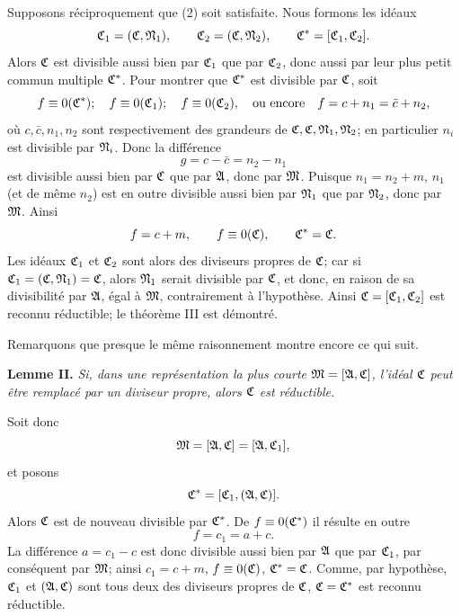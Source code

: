 Supposons réciproquement que (2) soit satisfaite. Nous formons les idéaux
\[
 \mathfrak{C}_1=(\mathfrak{C},\mathfrak{N}_1),\qquad
 \mathfrak{C}_2=(\mathfrak{C},\mathfrak{N}_2),\qquad
 \mathfrak{C}^*=[\mathfrak{C}_1,\mathfrak{C}_2].
\]
Alors $\mathfrak{C}$ est divisible aussi bien par $\mathfrak{C}_1$ que par $\mathfrak{C}_2$, donc aussi par leur plus petit commun multiple $\mathfrak{C}^*$. Pour montrer que $\mathfrak{C}^*$ est divisible par $\mathfrak{C}$, soit
\[
 f\equiv0(\mathfrak{C}^*);\quad f\equiv0(\mathfrak{C}_1);\quad f\equiv0(\mathfrak{C}_2),
 \quad\text{ou encore}\quad f=c+n_1=\bar c+n_2,
\]
où $c,\bar c,n_1,n_2$ sont respectivement des grandeurs de $\mathfrak{C},\mathfrak{C},\mathfrak{N}_1,\mathfrak{N}_2$; en particulier $n_i$ est divisible par $\mathfrak{N}_i$. Donc la différence
\[
 g=c-\bar c=n_2-n_1
\]
est divisible aussi bien par $\mathfrak{C}$ que par $\mathfrak{A}$, donc par $\mathfrak{M}$. Puisque $n_1=n_2+m$, $n_1$ (et de même $n_2$) est en outre divisible aussi bien par $\mathfrak{N}_1$ que par $\mathfrak{N}_2$, donc par $\mathfrak{M}$. Ainsi
\[
 f=c+m,\qquad f\equiv0(\mathfrak{C}),\qquad \mathfrak{C}^*=\mathfrak{C}.
\]
Les idéaux $\mathfrak{C}_1$ et $\mathfrak{C}_2$ sont alors des diviseurs propres de $\mathfrak{C}$; car si $\mathfrak{C}_1=(\mathfrak{C},\mathfrak{N}_1)=\mathfrak{C}$, alors $\mathfrak{N}_1$ serait divisible par $\mathfrak{C}$, et donc, en raison de sa divisibilité par $\mathfrak{A}$, égal à $\mathfrak{M}$, contrairement à l'hypothèse. Ainsi $\mathfrak{C}=[\mathfrak{C}_1,\mathfrak{C}_2]$ est reconnu réductible; le théorème III est démontré.

Remarquons que presque le même raisonnement montre encore ce qui suit.

\textbf{Lemme II.} \emph{Si, dans une représentation la plus courte $\mathfrak{M}=[\mathfrak{A},\mathfrak{C}]$, l'idéal $\mathfrak{C}$ peut être remplacé par un diviseur propre, alors $\mathfrak{C}$ est réductible.}

Soit donc
\[
 \mathfrak{M}=[\mathfrak{A},\mathfrak{C}]=[\mathfrak{A},\mathfrak{C}_1],
\]
et posons
\[
 \mathfrak{C}^*=[\mathfrak{C}_1,(\mathfrak{A},\mathfrak{C})].
\]
Alors $\mathfrak{C}$ est de nouveau divisible par $\mathfrak{C}^*$. De $f\equiv0(\mathfrak{C}^*)$ il résulte en outre
\[
 f=c_1=a+c.
\]
La différence $a=c_1-c$ est donc divisible aussi bien par $\mathfrak{A}$ que par $\mathfrak{C}_1$, par conséquent par $\mathfrak{M}$; ainsi $c_1=c+m$, $f\equiv0(\mathfrak{C})$, $\mathfrak{C}^*=\mathfrak{C}$. Comme, par hypothèse, $\mathfrak{C}_1$ et $(\mathfrak{A},\mathfrak{C})$ sont tous deux des diviseurs propres de $\mathfrak{C}$, $\mathfrak{C}=\mathfrak{C}^*$ est reconnu réductible.

